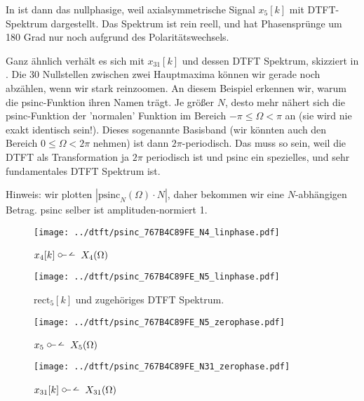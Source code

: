 \begin{Loesung}
In  ist dann das nullphasige, weil axialsymmetrische
Signal $x_5[k]$ mit DTFT-Spektrum dargestellt.
Das Spektrum ist rein reell, und hat Phasensprünge um 180 Grad nur
noch aufgrund des Polaritätswechsels.

Ganz ähnlich verhält es sich mit $x_{31}[k]$ und dessen DTFT Spektrum, skizziert
in . Die 30 Nullstellen zwischen
zwei Hauptmaxima können wir gerade noch abzählen, wenn wir stark reinzoomen.
An diesem Beispiel erkennen wir, warum die psinc-Funktion ihren Namen trägt.
Je größer $N$, desto mehr nähert sich die psinc-Funktion der 'normalen'
Funktion im Bereich $-\pi\leq\Omega<\pi$ an (sie wird nie exakt identisch sein!).
Dieses sogenannte Basisband (wir könnten auch den Bereich $0\leq\Omega<2\pi$ nehmen)
ist dann $2\pi$-periodisch. Das muss so sein, weil die DTFT als Transformation
ja $2\pi$ periodisch ist und psinc ein spezielles, und sehr fundamentales DTFT
Spektrum ist.

Hinweis: wir plotten $|\mathrm{psinc}_N(\Omega)\cdot N|$, daher bekommen wir
eine $N$-abhängigen Betrag. psinc selber ist amplituden-normiert 1.

\end{Loesung}
%
\begin{figure}
\centering
\texttt{[image: ../dtft/psinc\_767B4C89FE\_N4\_linphase.pdf]}
\caption{$x_4[k]\dtft X_4(\Omega)$}
\label{fig:psinc_767B4C89FE_N4_linphase}
\end{figure}
%
\begin{figure}
\centering
\texttt{[image: ../dtft/psinc\_767B4C89FE\_N5\_linphase.pdf]}
\caption{$\mathrm{rect}_5[k]$ und zugehöriges DTFT Spektrum.}
\label{fig:psinc_767B4C89FE_N5_linphase}
\end{figure}
%
\begin{figure}
\centering
\texttt{[image: ../dtft/psinc\_767B4C89FE\_N5\_zerophase.pdf]}
\caption{$x_5 \dtft X_5(\Omega)$}
\label{fig:psinc_767B4C89FE_N5_zerophase}
\end{figure}
%
\begin{figure}
\centering
\texttt{[image: ../dtft/psinc\_767B4C89FE\_N31\_zerophase.pdf]}
\caption{$x_{31}[k]\dtft X_{31}(\Omega)$}
\label{fig:psinc_767B4C89FE_N31_zerophase}
\end{figure}




\clearpage
